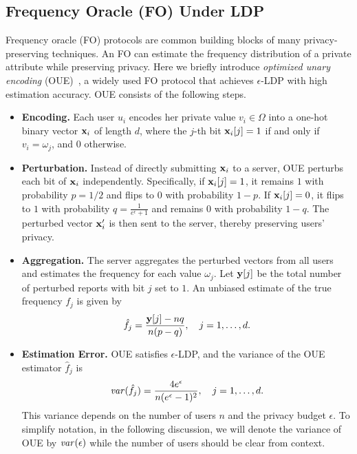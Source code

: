 \subsection{Frequency Oracle (FO) Under LDP}

Frequency oracle (FO) protocols are common building blocks of many
privacy-preserving techniques.
An FO can estimate the frequency distribution of a private attribute while
preserving privacy.
Here we briefly introduce \emph{optimized unary encoding} (OUE)~\cite{Wang2017l},
a widely used FO protocol that achieves $\epsilon$-LDP with high estimation
accuracy.
OUE consists of the following steps.
\begin{itemize}
\item{\textbf{Encoding.}} 
Each user $u_i$ encodes her private value $v_i\in\Omega$ into a one-hot binary
vector $\mathbf{x}_i$ of length $d$, where the $j$-th bit $\mathbf{x}_i[j] = 1$ if and only if
$v_i= \omega_j$, and $0$ otherwise.
\item{\textbf{Perturbation.}}
Instead of directly submitting $\mathbf{x}_i$ to a server, OUE perturbs each bit of
$\mathbf{x}_i$ independently.
Specifically, if $\mathbf{x}_i[j]=1$, it remains $1$ with probability $p = 1/2$ and
flips to $0$ with probability $1-p$.
If $\mathbf{x}_i[j]=0$, it flips to $1$ with probability $q = \frac{1}{e^\epsilon + 1}$
and remains $0$ with probability $1-q$.
The perturbed vector $\mathbf{x}_i'$ is then sent to the server, thereby preserving
users' privacy.
\item{\textbf{Aggregation.}}
The server aggregates the perturbed vectors from all users and estimates the
frequency for each value $\omega_j$.
Let $\mathbf{y}[j]$ be the total number of perturbed reports with bit $j$ set to $1$.
An unbiased estimate of the true frequency $f_j$ is given by
\[
  \hat{f}_j = \frac{\mathbf{y}[j] - nq}{n(p - q)}, \quad j=1,\ldots,d.
\]
\item{\textbf{Estimation Error.}}
OUE satisfies $\epsilon$-LDP, and the variance of the OUE estimator $\hat{f}_j$
is
\[
  \mathit{var}(\hat{f}_j) = \frac{4e^\epsilon}{n(e^\epsilon - 1)^2}, \quad j=1,\ldots,d.
\]
This variance depends on the number of users $n$ and the privacy budget
$\epsilon$.
To simplify notation, in the following discussion, we will denote the variance
of OUE by $\mathit{var}(\epsilon)$ while the number of users should be clear from
context.
\end{itemize}